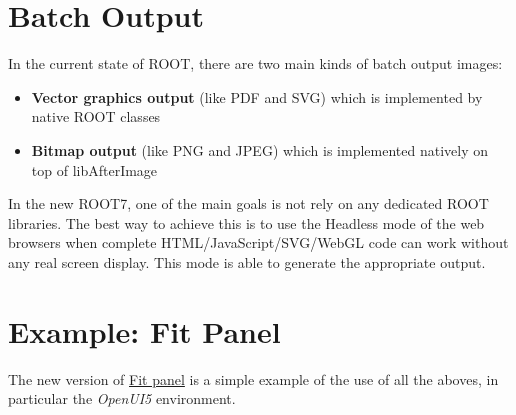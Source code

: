 \documentclass[a4paper]{jpconf}
\begin{document}

\section{Batch Output}
In the current state of ROOT, there are two main kinds of batch output images:
\begin{itemize}
  \item \textbf{Vector graphics output} (like PDF and SVG) which is implemented by native ROOT classes
  \item \textbf{Bitmap output} (like PNG and JPEG) which is implemented natively on top of libAfterImage
\end{itemize}

\noindent
In the new ROOT7, one of the main goals is not rely on any dedicated ROOT libraries. The best way to achieve this is to use the \textit{}{Headless mode} of the web browsers when complete HTML/JavaScript/SVG/WebGL code can work without any real screen display. This mode is able to generate the appropriate output.

\section{Example: Fit Panel}

The new version of \href{https://root.cern.ch/fit-panel}{Fit panel} is a simple example of the use of all the aboves, in particular the \textit{OpenUI5} environment.
\end{document}
